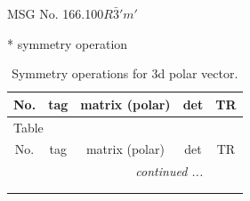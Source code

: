\documentclass[fleqn,8pt]{jsarticle}
\begin{document}
\setcounter{MaxMatrixCols}{32}

\renewcommand{\tablename}{Table~}
\renewcommand{\figurename}{Figure~}
\begin{center}
\LARGE
MSG No. 166.100\quad$R\bar{3}'m'$
\end{center}
* symmetry operation
\renewcommand{\arraystretch}{1.3}
\begin{longtable}{ccccc}
\caption{Symmetry operations for 3d polar vector.}
 \\
 \hline \hline
No. & tag & matrix (polar) & det & TR \\ \hline \endfirsthead

\multicolumn{4}{l}{\tablename\ \thetable{}} \\
 \hline \hline
No. & tag & matrix (polar) & det & TR \\ \hline \endhead

 \hline \hline
\multicolumn{4}{r}{\footnotesize\it continued ...} \\ \endfoot

 \hline \hline
\multicolumn{4}{r}{} \\ \endlastfoot


\end{longtable}
\end{document}
